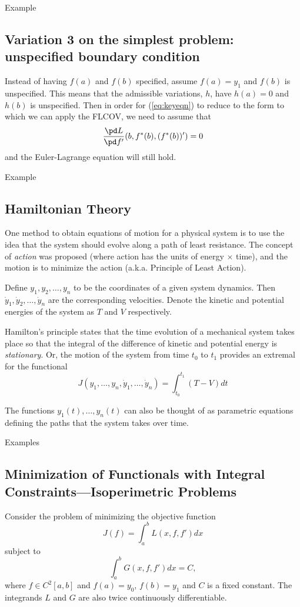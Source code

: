 \medskip



\noindent Example
\newpage

\subsection{Variation 3 on the simplest problem:  unspecified boundary condition} Instead of having $f(a)$ and $f(b)$ specified, assume $f(a) = y_1$ and $f(b)$ is unspecified. This means that the admissible variations, $h$, have $h(a) = 0$ and $h(b)$ is unspecified. Then in order for (\ref{eq:keyeqn}) to reduce to the form to which we can apply the FLCOV, we need to assume that 
$$\frac{\pd L}{\pd f'}(b, f^*(b), (f^*(b))') = 0$$
and the Euler-Lagrange equation will still hold. 

Example

\newpage
\subsection{Hamiltonian Theory}
One method to obtain equations of motion for a physical system is to use the idea that the system should evolve along a path of least resistance. The concept of {\it action} was proposed (where action has the units of energy $\times$ time), and the motion is to minimize the action (a.k.a. Principle of Least Action).

Define $y_1, y_2, \ldots, y_n$ to be the coordinates of a given system dynamics. Then $\dot y_1, \dot y_2, \ldots, \dot y_n$ are the corresponding velocities. Denote the kinetic and potential energies of the system as $T$ and $V$ respectively.
\smallskip

\noindent Hamilton's principle states that the time evolution of a mechanical system takes place so that the integral of the difference of kinetic and potential energy is {\it stationary}.  Or, the motion of the system from time $t_0$ to $t_1$ provides an extremal for the functional
$$J(y_1, \ldots, y_n, \dot y_1, \ldots, \dot y_n) = \int_{t_0}^{t_1} (T-V)dt$$

The functions $y_1(t), \ldots, y_n(t)$ can also be thought of as parametric equations defining the paths that the system takes over time.

\medskip

Examples

\newpage
\subsection{Minimization of Functionals with Integral Constraints---Isoperimetric Problems}
Consider the problem of minimizing the objective function
$$ J(f) = \int_a^b L(x, f, f') dx$$
subject to
$$ \int_a^b G(x, f, f')dx = C,$$
where $f\in C^2[a,b]$ and $f(a) = y_0$, $f(b) = y_1$ and $C$ is a fixed constant. The integrands $L$ and $G$ are also twice continuously differentiable.  

